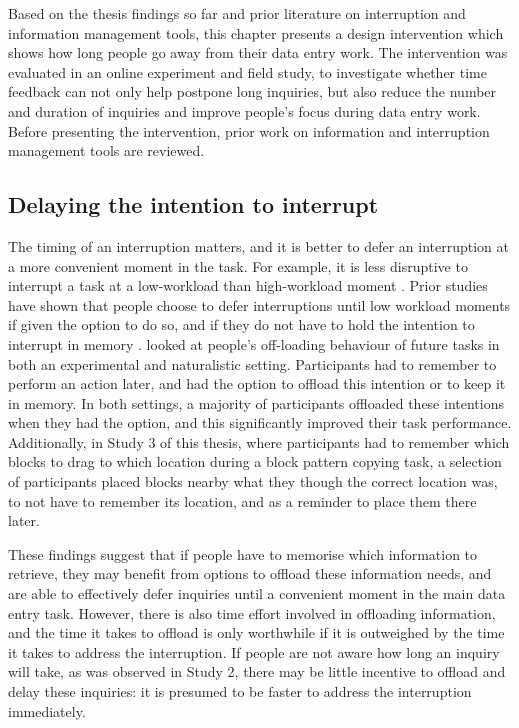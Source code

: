 Based on the thesis findings so far and prior literature on interruption and information management tools, this chapter presents a design intervention which shows how long people go away from their data entry work. The intervention was evaluated in an online experiment and field study, to investigate whether time feedback can not only help postpone long inquiries, but also reduce the number and duration of inquiries and improve people’s focus during data entry work. Before presenting the intervention, prior work on information and interruption management tools are reviewed. 

\subsection{Delaying the intention to interrupt}
The timing of an interruption matters, and it is better to defer an interruption at a more convenient moment in the task. For example, it is less disruptive to interrupt a task at a low-workload than high-workload moment \citep{Gould2013a, Iqbal2005}. Prior studies have shown that people choose to defer interruptions until low workload moments if given the option to do so, and if they do not have to hold the intention to interrupt in memory \citep{Gilbert2015, Salvucci2010}. \citet{Gilbert2015} looked at people’s off-loading behaviour of future tasks in both an experimental and naturalistic setting. Participants had to remember to perform an action later, and had the option to offload this intention or to keep it in memory. In both settings, a majority of participants offloaded these intentions when they had the option, and this significantly improved their task performance. Additionally, in Study 3 of this thesis, where participants had to remember which blocks to drag to which location during a block pattern copying task, a selection of participants placed blocks nearby what they though the correct location was, to not have to remember its location, and as a reminder to place them there later. 

These findings suggest that if people have to memorise which information to retrieve, they may benefit from options to offload these information needs, and are able to effectively defer inquiries until a convenient moment in the main data entry task. However, there is also time effort involved in offloading information, and the time it takes to offload is only worthwhile if it is outweighed by the time it takes to address the interruption. If people are not aware how long an inquiry will take, as was observed in Study 2, there may be little incentive to offload and delay these inquiries: it is presumed to be faster to address the interruption immediately.

